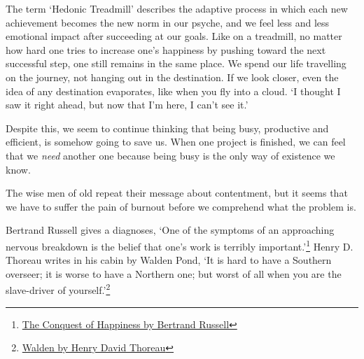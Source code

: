 \clearpage


The term `Hedonic Treadmill' describes the adaptive process in which
each new achievement becomes the new norm in our psyche, and we feel
less and less emotional impact after succeeding at our goals. Like on a
treadmill, no matter how hard one tries to increase one's happiness by
pushing toward the next successful step, one still remains in the same
place. We spend our life travelling on the journey, not hanging out in
the destination. If we look closer, even the idea of any destination
evaporates, like when you fly into a cloud. `I thought I saw it right
ahead, but now that I'm here, I can't see it.'

Despite this, we seem to continue thinking that being busy, productive
and efficient, is somehow going to save us. When one project is
finished, we can feel that we \emph{need} another one because being busy
is the only way of existence we know.

\enlargethispage*{2\baselineskip}

The wise men of old repeat their message about contentment, but it seems
that we have to suffer the pain of burnout before we comprehend what the
problem is.

Bertrand Russell gives a diagnoses, `One of the symptoms of an
approaching nervous breakdown is the belief that one's work is terribly
important.'\footnote{\href{https://www.goodreads.com/book/show/51783.The_Conquest_of_Happiness}{The
  Conquest of Happiness by Bertrand Russell}} Henry D. Thoreau writes in
his cabin by Walden Pond, `It is hard to have a Southern overseer; it is
worse to have a Northern one; but worst of all when you are the
slave-driver of yourself.'\footnote{\href{https://www.goodreads.com/book/show/16902.Walden}{Walden
  by Henry David Thoreau}}

\clearpage

